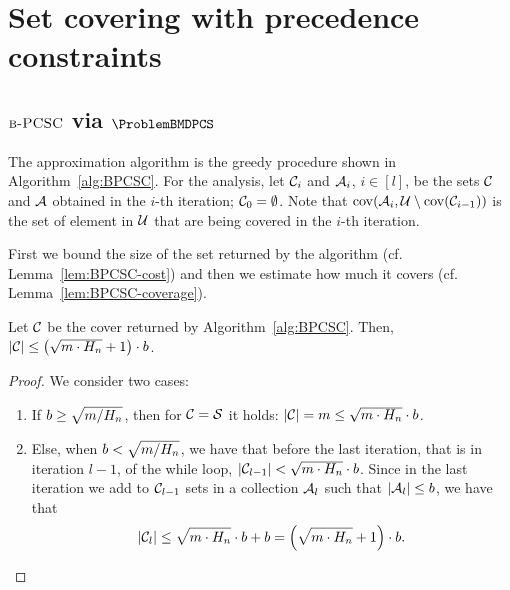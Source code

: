 \section{Set covering with precedence constraints} \label{sec:SC}


\subsection{$\textup{\textsc{b-PCSC}}$ via $\ProblemBMDPCS$} \label{subsection:BPCSC}

The approximation algorithm is the greedy procedure shown in Algorithm~\ref{alg:BPCSC}.
For the analysis, let $\mathcal{C}_i$ and $\mathcal{A}_i$, $i\in[l]$, be the sets $\mathcal{C}$ and $\mathcal{A}$ obtained in the $i$-th iteration; $\mathcal{C}_0=\emptyset$.
Note that $\operatorname{cov}\mathopen{}\left( \mathcal{A}_i,\mathcal{U}\setminus\operatorname{cov}\mathopen{}\left( \mathcal{C}_{i-1} \right) \right)$ is the set of element in $\mathcal{U}$ that are being covered in the $i$-th iteration. %


First we bound the size of the set returned by the algorithm (cf. Lemma~\ref{lem:BPCSC-cost}) and then we estimate how much it covers (cf. Lemma~\ref{lem:BPCSC-coverage}).
\begin{lemma}\label{lem:BPCSC-cost}
    Let $\mathcal{C}$ be the cover returned by Algorithm~\ref{alg:BPCSC}. Then, $\mathopen{}\left| \mathcal{C} \right| \leq \mathopen{}\left( \sqrt{m\cdot H_n}+1 \right)\cdot b$.
\end{lemma}
\begin{proof}
    We consider two cases:
    \begin{enumerate}
        \item If $b\geq \sqrt{m/H_n}$, then for $\mathcal{C}=\mathcal{S}$ it holds: $\mathopen{}\left| \mathcal{C} \right| = m \leq \sqrt{m\cdot H_n}\cdot b$.
        \item Else, when $b < \sqrt{m/H_n}$, we have that before the last iteration, that is in iteration $l-1$, of the while loop, $\mathopen{}\left| \mathcal{C}_{l-1} \right| < \sqrt{m\cdot H_n}\cdot b$. Since in the last iteration we add to $\mathcal{C}_{l-1}$ sets in a collection $\mathcal{A}_l$ such that $\mathopen{}\left| \mathcal{A}_l \right| \leq b$, we have that 
        \[
        \mathopen{}\left| \mathcal{C}_l \right| \leq \sqrt{m\cdot H_n}\cdot b + b = \mathopen{}\left( \sqrt{m\cdot H_n}+1 \right)\cdot b.
        \]
    \end{enumerate}
\end{proof}


